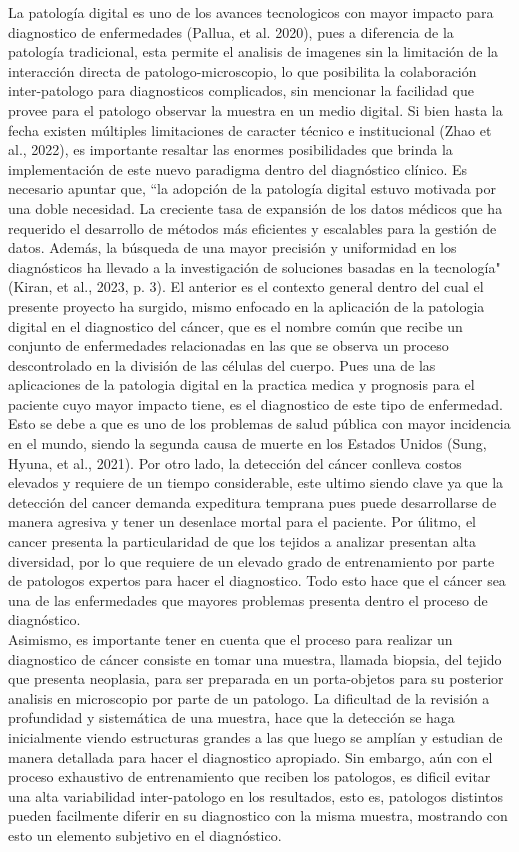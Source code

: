 \documentclass[12pt,letterpaper,final, openany]{scrbook}
\begin{document}
La patología digital es uno de los avances tecnologicos con mayor impacto para diagnostico de enfermedades (Pallua, et al. 2020), pues a diferencia de la patología tradicional, esta permite el analisis de imagenes sin la limitación de la interacción directa de patologo-microscopio, lo que posibilita la colaboración inter-patologo para diagnosticos complicados, sin mencionar la facilidad que provee para el patologo observar la muestra en un medio digital. Si bien hasta la fecha existen múltiples limitaciones de caracter técnico e institucional (Zhao et al., 2022), es importante resaltar las enormes posibilidades que brinda la implementación de este nuevo paradigma dentro del diagnóstico clínico. Es necesario apuntar que, ``la adopción de la patología digital estuvo motivada por una doble necesidad. La creciente tasa de expansión de los datos médicos que ha requerido el desarrollo de métodos más eficientes y escalables para la gestión de datos. Además, la búsqueda de una mayor precisión y uniformidad en los diagnósticos ha llevado a la investigación de soluciones basadas en la tecnología" (Kiran, et al., 2023, p. 3). El anterior es el contexto general dentro del cual el presente proyecto ha surgido, mismo enfocado en la aplicación de la patologia digital en el diagnostico del cáncer, que es el nombre común que recibe un conjunto de enfermedades relacionadas en las que se observa un proceso descontrolado en la división de las células del cuerpo. Pues una de las aplicaciones de la patologia digital en la practica medica y prognosis para el paciente cuyo mayor impacto tiene, es el diagnostico de este tipo de enfermedad. Esto se debe a que es uno de los problemas de salud pública con mayor incidencia en el mundo, siendo la segunda causa de muerte en los Estados Unidos (Sung, Hyuna, et al., 2021). Por otro lado, la detección del cáncer conlleva costos elevados y requiere de un tiempo considerable, este ultimo siendo clave ya que la detección del cancer demanda expeditura temprana pues puede desarrollarse de manera agresiva y tener un desenlace mortal para el paciente. Por úlitmo, el cancer presenta la particularidad de que los tejidos a analizar presentan alta diversidad, por lo que requiere de un elevado grado de entrenamiento por parte de patologos expertos para hacer el diagnostico. Todo esto hace que el cáncer sea una de las enfermedades que mayores problemas presenta dentro el proceso de diagnóstico.
\\
Asimismo, es importante tener en cuenta que el proceso para realizar un diagnostico de cáncer consiste en tomar una muestra, llamada biopsia, del tejido que presenta neoplasia, para ser preparada en un porta-objetos para su posterior analisis en microscopio por parte de un patologo. La dificultad de la revisión a profundidad y sistemática de una muestra, hace que la detección se haga inicialmente viendo estructuras grandes a las que luego se amplían y estudian de manera detallada para hacer el diagnostico apropiado. Sin embargo, aún con el proceso exhaustivo de entrenamiento que reciben los patologos, es dificil evitar una alta variabilidad inter-patologo en los resultados, esto es, patologos distintos pueden facilmente diferir en su diagnostico con la misma muestra, mostrando con esto un elemento subjetivo en el diagnóstico. 
\end{document}
